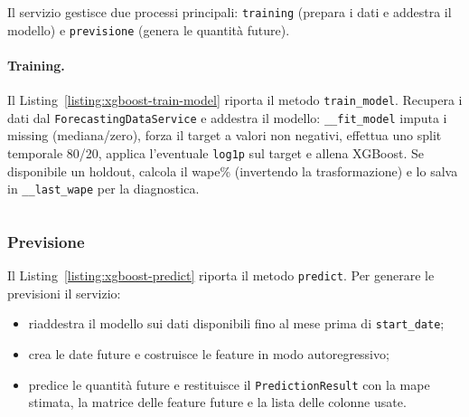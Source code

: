 Il servizio gestisce due processi principali: \texttt{training} (prepara i dati e addestra il modello) e \texttt{previsione} (genera le quantità future).
\paragraph{Training.}
Il Listing~\ref{listing:xgboost-train-model} riporta il metodo \texttt{train\_model}. Recupera i dati dal \texttt{ForecastingDataService} e addestra il modello: \texttt{\_\_fit\_model} imputa i missing (mediana/zero), forza il target a valori non negativi, effettua uno split temporale 80/20, applica l’eventuale \texttt{log1p} sul target e allena XGBoost. Se disponibile un \gls{holdout}, calcola il \acrshort{wape}\% (invertendo la trasformazione) e lo salva in \texttt{\_\_last\_wape} per la diagnostica.
\captionsetup{type=listing, belowskip=0pt}
\inputminted[fontsize=\small, breaklines, breakanywhere=true, linenos=true, bgcolor=gray!10]{python}{code/services/def/xgboost_train_model.py}
\label{listing:xgboost-train-model}

\subsubsection{Previsione}
Il Listing~\ref{listing:xgboost-predict} riporta il metodo \texttt{predict}. Per generare le previsioni il servizio:
\begin{itemize}
    \item riaddestra il modello sui dati disponibili fino al mese prima di \texttt{start\_date};
    \item crea le date future e costruisce le feature in modo autoregressivo;
    \item predice le quantità future e restituisce il \texttt{PredictionResult} con la \acrshort{mape} stimata, la matrice delle feature future e la lista delle colonne usate.
\end{itemize}
\captionsetup{type=listing, belowskip=0pt}
\inputminted[fontsize=\small, breaklines, breakanywhere=true, linenos=true, bgcolor=gray!10]{python}{code/services/def/xgboost_predict.py}
\label{listing:xgboost-predict}

